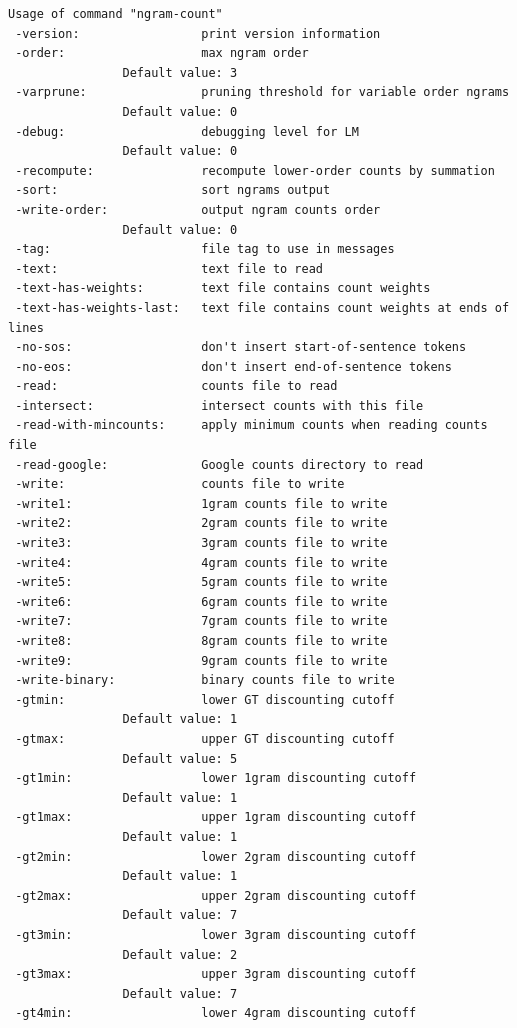 \documentclass[11pt]{article}
\begin{document}
    \begin{Verbatim}[commandchars=\\\{\}]
Usage of command "ngram-count"
 -version:                 print version information
 -order:                   max ngram order
                Default value: 3
 -varprune:                pruning threshold for variable order ngrams
                Default value: 0
 -debug:                   debugging level for LM
                Default value: 0
 -recompute:               recompute lower-order counts by summation
 -sort:                    sort ngrams output
 -write-order:             output ngram counts order
                Default value: 0
 -tag:                     file tag to use in messages
 -text:                    text file to read
 -text-has-weights:        text file contains count weights
 -text-has-weights-last:   text file contains count weights at ends of lines
 -no-sos:                  don't insert start-of-sentence tokens
 -no-eos:                  don't insert end-of-sentence tokens
 -read:                    counts file to read
 -intersect:               intersect counts with this file
 -read-with-mincounts:     apply minimum counts when reading counts file
 -read-google:             Google counts directory to read
 -write:                   counts file to write
 -write1:                  1gram counts file to write
 -write2:                  2gram counts file to write
 -write3:                  3gram counts file to write
 -write4:                  4gram counts file to write
 -write5:                  5gram counts file to write
 -write6:                  6gram counts file to write
 -write7:                  7gram counts file to write
 -write8:                  8gram counts file to write
 -write9:                  9gram counts file to write
 -write-binary:            binary counts file to write
 -gtmin:                   lower GT discounting cutoff
                Default value: 1
 -gtmax:                   upper GT discounting cutoff
                Default value: 5
 -gt1min:                  lower 1gram discounting cutoff
                Default value: 1
 -gt1max:                  upper 1gram discounting cutoff
                Default value: 1
 -gt2min:                  lower 2gram discounting cutoff
                Default value: 1
 -gt2max:                  upper 2gram discounting cutoff
                Default value: 7
 -gt3min:                  lower 3gram discounting cutoff
                Default value: 2
 -gt3max:                  upper 3gram discounting cutoff
                Default value: 7
 -gt4min:                  lower 4gram discounting cutoff

\end{Verbatim}
\end{document}
